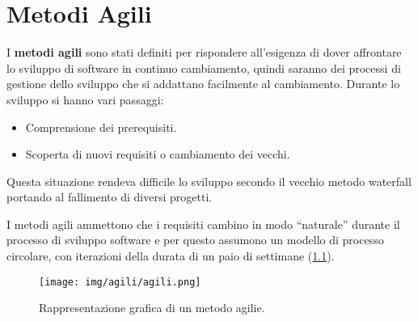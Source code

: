 \chapter{Metodi Agili}
I \textbf{metodi agili} sono stati definiti per rispondere all'esigenza di dover
affrontare lo sviluppo di software in continuo cambiamento, quindi saranno dei 
processi di gestione dello sviluppo che si addattano facilmente al cambiamento. 
Durante lo sviluppo si hanno vari passaggi:
\begin{itemize}
      \item Comprensione dei prerequisiti.
      \item Scoperta di nuovi requisiti o cambiamento dei vecchi.
\end{itemize}

Questa situazione rendeva difficile lo sviluppo secondo il vecchio metodo
waterfall portando al fallimento di diversi progetti.

I metodi agili ammettono che i requisiti cambino in modo “naturale” durante il
processo di sviluppo software e per questo assumono un modello di processo
circolare, con iterazioni della durata di un paio di settimane (\ref{fig:agili}).

\begin{figure}[!ht]
      \centering
      \texttt{[image: img/agili/agili.png]}
      \caption{Rappresentazione grafica di un metodo agilie.}
      \label{fig:agili}
\end{figure}

